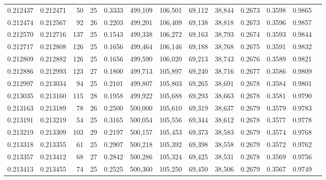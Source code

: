 \begin{tabular}{rrrrrrrrrrrrr}
0.212437 & 0.212471 &  50 &  25 &                                     0.3333 & 499,109 & 106,501 &  69,112 &  38,844 & 0.2673 & 0.3598 & 0.9865 \\
0.212474 & 0.212567 &  92 &  26 &                                     0.2203 & 499,201 & 106,409 &  69,138 &  38,818 & 0.2673 & 0.3596 & 0.9857 \\
0.212570 & 0.212716 & 137 &  25 &                                     0.1543 & 499,338 & 106,272 &  69,163 &  38,793 & 0.2674 & 0.3593 & 0.9844 \\
0.212717 & 0.212808 & 126 &  25 &                                     0.1656 & 499,464 & 106,146 &  69,188 &  38,768 & 0.2675 & 0.3591 & 0.9832 \\
0.212809 & 0.212882 & 126 &  25 &                                     0.1656 & 499,590 & 106,020 &  69,213 &  38,743 & 0.2676 & 0.3589 & 0.9821 \\
0.212886 & 0.212993 & 123 &  27 &                                     0.1800 & 499,713 & 105,897 &  69,240 &  38,716 & 0.2677 & 0.3586 & 0.9809 \\
0.212997 & 0.213034 &  94 &  25 &                                     0.2101 & 499,807 & 105,803 &  69,265 &  38,691 & 0.2678 & 0.3584 & 0.9801 \\
0.213035 & 0.213160 & 115 &  28 &                                     0.1958 & 499,922 & 105,688 &  69,293 &  38,663 & 0.2678 & 0.3581 & 0.9790 \\
0.213163 & 0.213189 &  78 &  26 &                                     0.2500 & 500,000 & 105,610 &  69,319 &  38,637 & 0.2679 & 0.3579 & 0.9783 \\
0.213191 & 0.213219 &  54 &  25 &                                     0.3165 & 500,054 & 105,556 &  69,344 &  38,612 & 0.2678 & 0.3577 & 0.9778 \\
0.213219 & 0.213309 & 103 &  29 &                                     0.2197 & 500,157 & 105,453 &  69,373 &  38,583 & 0.2679 & 0.3574 & 0.9768 \\
0.213318 & 0.213355 &  61 &  25 &                                     0.2907 & 500,218 & 105,392 &  69,398 &  38,558 & 0.2679 & 0.3572 & 0.9762 \\
0.213357 & 0.213412 &  68 &  27 &                                     0.2842 & 500,286 & 105,324 &  69,425 &  38,531 & 0.2678 & 0.3569 & 0.9756 \\
0.213413 & 0.213455 &  74 &  25 &                                     0.2525 & 500,360 & 105,250 &  69,450 &  38,506 & 0.2679 & 0.3567 & 0.9749 \\

\end{tabular}
